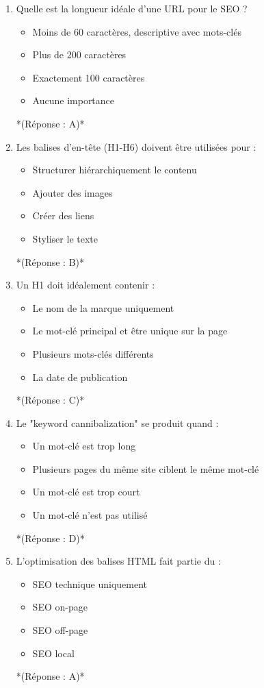 \documentclass[12pt,a4paper,twoside]{report}
\begin{document}
\begin{enumerate}
\item Quelle est la longueur idéale d'une URL pour le SEO ?
\begin{itemize}
\item[A)] Moins de 60 caractères, descriptive avec mots-clés
\item[B)] Plus de 200 caractères
\item[C)] Exactement 100 caractères
\item[D)] Aucune importance
\end{itemize}
*(Réponse : A)*

\item Les balises d'en-tête (H1-H6) doivent être utilisées pour :
\begin{itemize}
\item[A)] Structurer hiérarchiquement le contenu
\item[B)] Ajouter des images
\item[C)] Créer des liens
\item[D)] Styliser le texte
\end{itemize}
*(Réponse : B)*

\item Un H1 doit idéalement contenir :
\begin{itemize}
\item[A)] Le nom de la marque uniquement
\item[B)] Le mot-clé principal et être unique sur la page
\item[C)] Plusieurs mots-clés différents
\item[D)] La date de publication
\end{itemize}
*(Réponse : C)*

\item Le "keyword cannibalization" se produit quand :
\begin{itemize}
\item[A)] Un mot-clé est trop long
\item[B)] Plusieurs pages du même site ciblent le même mot-clé
\item[C)] Un mot-clé est trop court
\item[D)] Un mot-clé n'est pas utilisé
\end{itemize}
*(Réponse : D)*

\item L'optimisation des balises HTML fait partie du :
\begin{itemize}
\item[A)] SEO technique uniquement
\item[B)] SEO on-page
\item[C)] SEO off-page
\item[D)] SEO local
\end{itemize}
*(Réponse : A)*


\end{enumerate}
\end{document}
